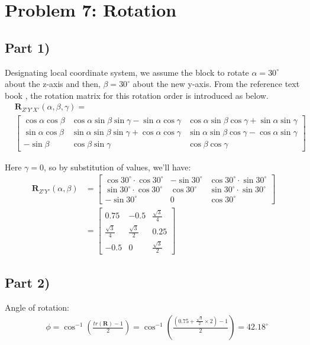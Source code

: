 \documentclass[conference]{IEEEtran}
\begin{document}
\vspace{10px}
\section{Problem 7: Rotation}
\subsection*{Part 1)}
Designating local coordinate system, we assume the block to rotate $\alpha = 30^\circ$ about the z-axis and then, $\beta = 30^\circ$ about the new y-axis. From the reference text book \cite{b12}, the rotation matrix for this rotation order is introduced as below.
\begin{align}
    &\mathbf{R}_{Z'Y'X'}(\alpha, \beta, \gamma) = \\
    &\begin{bmatrix}
    \cos\alpha\cos\beta & \cos\alpha\sin\beta\sin\gamma - \sin\alpha\cos\gamma & \cos\alpha\sin\beta\cos\gamma + \sin\alpha\sin\gamma \\
    \sin\alpha\cos\beta & \sin\alpha\sin\beta\sin\gamma + \cos\alpha\cos\gamma & \sin\alpha\sin\beta\cos\gamma - \cos\alpha\sin\gamma \\
    -\sin\beta & \cos\beta\sin\gamma & \cos\beta\cos\gamma
\end{bmatrix} \nonumber
\end{align}

Here $\gamma = 0$, so by substitution of values, we'll have:
\begin{align}
    \mathbf{R}_{Z'Y'}(\alpha, \beta) &= 
    \begin{bmatrix}
        \cos 30^\circ \cdot \cos 30^\circ & -\sin 30^\circ & \cos 30^\circ \cdot \sin 30^\circ \\
        \sin 30^\circ \cdot \cos 30^\circ & \cos 30^\circ & \sin 30^\circ \cdot \sin 30^\circ \\
        -\sin 30^\circ & 0 & \cos 30^\circ
    \end{bmatrix} \nonumber \\
    & = 
    \begin{bmatrix}
        0.75 & -0.5 & \frac{\sqrt{3}}{4} \\
        \frac{\sqrt{3}}{4} & \frac{\sqrt{3}}{2} & 0.25 \\
        -0.5 & 0 & \frac{\sqrt{3}}{2}
    \end{bmatrix}
\end{align}
    
\subsection*{Part 2)}
Angle of rotation:
\begin{align}
    &\phi = \cos ^{-1} \left(\frac{tr(\mathbf{R}) - 1}{2}\right) = \cos ^{-1} \left(\frac{(0.75 + \frac{\sqrt{3}}{2} \times 2) - 1}{2}\right) = 42.18^\circ
\end{align}
    
\end{document}
